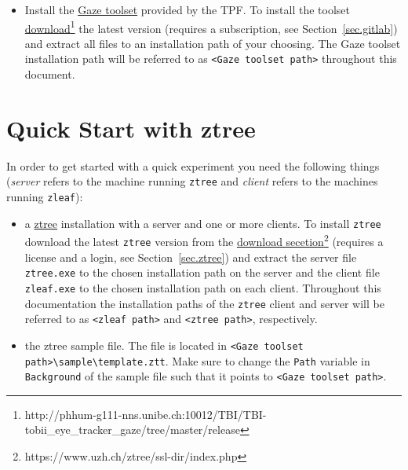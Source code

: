 \documentclass[a4paper,oneside]{book}
\begin{document}
\begin{itemize}
\begin{itemize}
        \end{itemize}
    \item Install the \href{http://phhum-g111-nns.unibe.ch:10012/TBI/TBI-tobii_eye_tracker_gaze}{Gaze toolset} provided by the TPF.
        To install the toolset \href{http://phhum-g111-nns.unibe.ch:10012/TBI/TBI-tobii_eye_tracker_gaze/tree/master/release}{download}\footnote{http://phhum-g111-nns.unibe.ch:10012/TBI/TBI-tobii\_eye\_tracker\_gaze/tree/master/release} the latest version (requires a subscription, see Section~\ref{sec.gitlab}) and extract all files to an installation path of your choosing.
        The Gaze toolset installation path will be referred to as \texttt{<Gaze toolset path>} throughout this document.
\end{itemize}


\section{Quick Start with ztree}
\label{sec.quick.ztree}
In order to get started with a quick experiment you need the following things (\emph{server} refers to the machine running \texttt{ztree} and \emph{client} refers to the machines running \texttt{zleaf}):
\begin{itemize}
    \item a \href{http://www.ztree.uzh.ch/en.html}{ztree} installation with a server and one or more clients.
        To install \texttt{ztree} download the latest \texttt{ztree} version from the \href{https://www.uzh.ch/ztree/ssl-dir/index.php}{download secetion}\footnote{https://www.uzh.ch/ztree/ssl-dir/index.php} (requires a license and a login, see Section~\ref{sec.ztree}) and extract the server file \texttt{ztree.exe} to the chosen installation path on the server and the client file \texttt{zleaf.exe} to the chosen installation path on each client.
        Throughout this documentation the installation paths of the \texttt{ztree} client and server will be referred to as \texttt{<zleaf path>} and \texttt{<ztree path>}, respectively.
    \item the ztree sample file.
        The file is located in \texttt{<Gaze toolset path>\textbackslash sample\textbackslash template.ztt}.
        Make sure to change the \texttt{Path} variable in \texttt{Background} of the sample file such that it points to \texttt{<Gaze toolset path>}.
\end{itemize}
\end{document}
